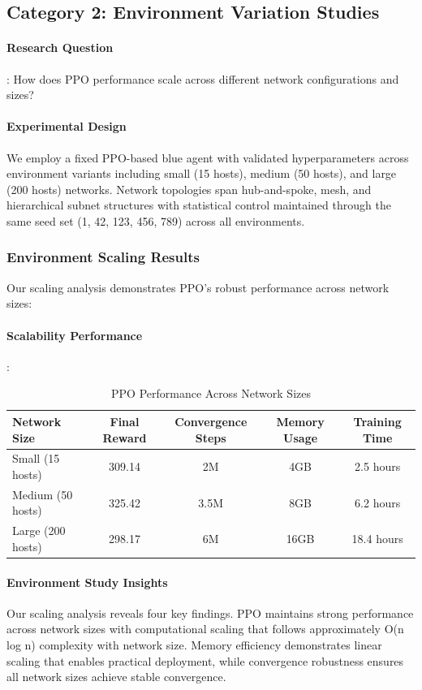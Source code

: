 \documentclass[12pt,oneside]{article}
\begin{document}
\subsection{Category 2: Environment Variation Studies}

\paragraph{Research Question}: How does PPO performance scale across different network configurations and sizes?

\paragraph{Experimental Design} We employ a fixed PPO-based blue agent with validated hyperparameters across environment variants including small (15 hosts), medium (50 hosts), and large (200 hosts) networks. Network topologies span hub-and-spoke, mesh, and hierarchical subnet structures with statistical control maintained through the same seed set (1, 42, 123, 456, 789) across all environments.

\subsubsection{Environment Scaling Results}

Our scaling analysis demonstrates PPO's robust performance across network sizes:

\paragraph{Scalability Performance}:
\begin{table}[H]
\centering
\caption{PPO Performance Across Network Sizes}
\begin{tabular}{|l|c|c|c|c|}
\hline
\textbf{Network Size} & \textbf{Final Reward} & \textbf{Convergence Steps} & \textbf{Memory Usage} & \textbf{Training Time} \\
\hline
Small (15 hosts) & 309.14 & 2M & 4GB & 2.5 hours \\
Medium (50 hosts) & 325.42 & 3.5M & 8GB & 6.2 hours \\  
Large (200 hosts) & 298.17 & 6M & 16GB & 18.4 hours \\
\hline
\end{tabular}
\end{table}
\clearpage

\paragraph{Environment Study Insights} Our scaling analysis reveals four key findings. PPO maintains strong performance across network sizes with computational scaling that follows approximately O(n log n) complexity with network size. Memory efficiency demonstrates linear scaling that enables practical deployment, while convergence robustness ensures all network sizes achieve stable convergence.
\end{document}
